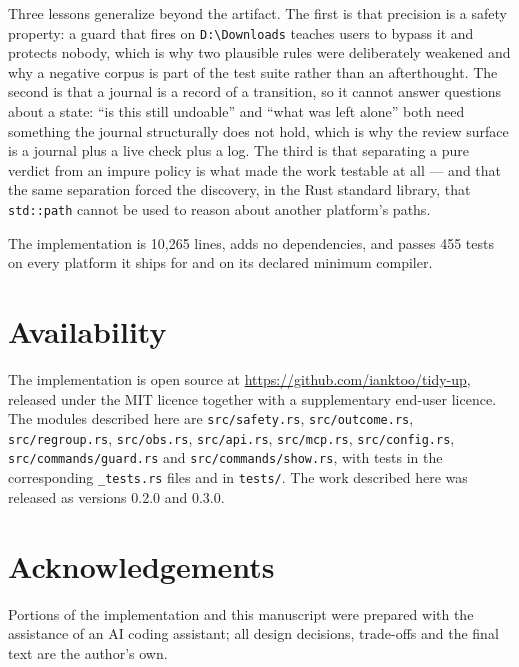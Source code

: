\documentclass[11pt,a4paper]{article}
\newcommand{\code}[1]{\texttt{\small #1}}
\begin{document}
Three lessons generalize beyond the artifact. The first is that precision is a safety
property: a guard that fires on \code{D:\textbackslash Downloads} teaches users to bypass
it and protects nobody, which is why two plausible rules were deliberately weakened and
why a negative corpus is part of the test suite rather than an afterthought. The second is that a journal is a record of a transition, so it
cannot answer questions about a state: \enquote{is this still undoable} and
\enquote{what was left alone} both need something the journal structurally does
not hold, which is why the review surface is a journal plus a live check plus a
log. The third
is that separating a pure verdict from an impure policy is what made the work testable
at all --- and that the same separation forced the discovery, in the Rust standard
library, that \code{std::path} cannot be used to reason about another platform's paths.

The implementation is 10{,}265 lines, adds no dependencies, and passes 455 tests
on every platform it ships for and on its declared minimum compiler.

\section*{Availability}

The implementation is open source at
\url{https://github.com/ianktoo/tidy-up}, released under the MIT licence together with
a supplementary end-user licence. The modules described here are \code{src/safety.rs},
\code{src/outcome.rs}, \code{src/regroup.rs}, \code{src/obs.rs},
\code{src/api.rs}, \code{src/mcp.rs}, \code{src/config.rs},
\code{src/commands/guard.rs} and \code{src/commands/show.rs}, with tests in the
corresponding \code{*\_tests.rs} files and in \code{tests/}. The work described
here was released as versions 0.2.0 and 0.3.0.

\section*{Acknowledgements}

Portions of the implementation and this manuscript were prepared with the assistance
of an AI coding assistant; all design decisions, trade-offs and the final text are the
author's own.
\end{document}
